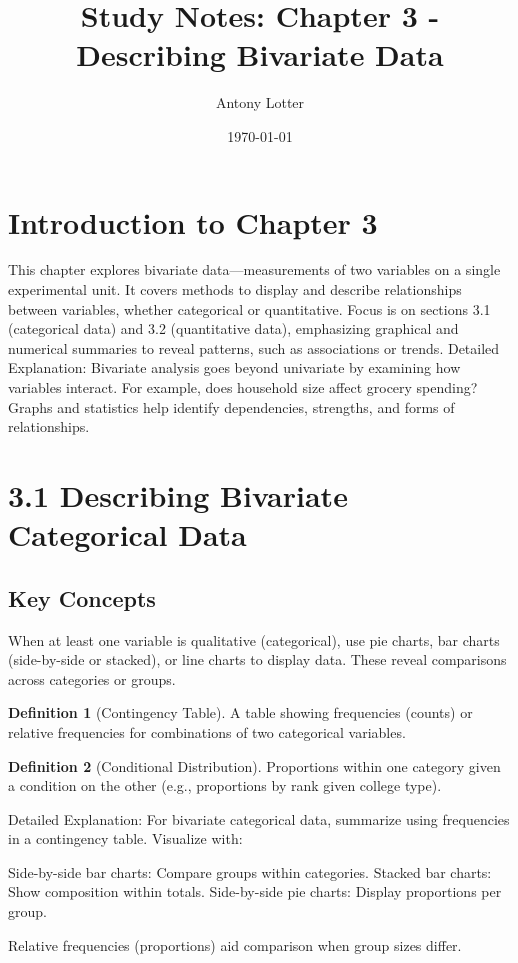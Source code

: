 \documentclass{article}
\title{Study Notes: Chapter 3 - Describing Bivariate Data}
\author{Antony Lotter}
\date{\today}
\theoremstyle{definition}
\newtheorem{definition}{Definition}
\begin{document}
	\maketitle
	\section{Introduction to Chapter 3}
	This chapter explores bivariate data—measurements of two variables on a single experimental unit. It covers methods to display and describe relationships between variables, whether categorical or quantitative. Focus is on sections 3.1 (categorical data) and 3.2 (quantitative data), emphasizing graphical and numerical summaries to reveal patterns, such as associations or trends.
	Detailed Explanation: Bivariate analysis goes beyond univariate by examining how variables interact. For example, does household size affect grocery spending? Graphs and statistics help identify dependencies, strengths, and forms of relationships.
	\section*{3.1 Describing Bivariate Categorical Data}
	\subsection{Key Concepts}
	When at least one variable is qualitative (categorical), use pie charts, bar charts (side-by-side or stacked), or line charts to display data. These reveal comparisons across categories or groups.
	\begin{definition}[Contingency Table]
		A table showing frequencies (counts) or relative frequencies for combinations of two categorical variables.
	\end{definition}
	\begin{definition}[Conditional Distribution]
		Proportions within one category given a condition on the other (e.g., proportions by rank given college type).
	\end{definition}
	Detailed Explanation: For bivariate categorical data, summarize using frequencies in a contingency table. Visualize with:
	
	Side-by-side bar charts: Compare groups within categories.
	Stacked bar charts: Show composition within totals.
	Side-by-side pie charts: Display proportions per group.
	
	Relative frequencies (proportions) aid comparison when group sizes differ.
\end{document}
